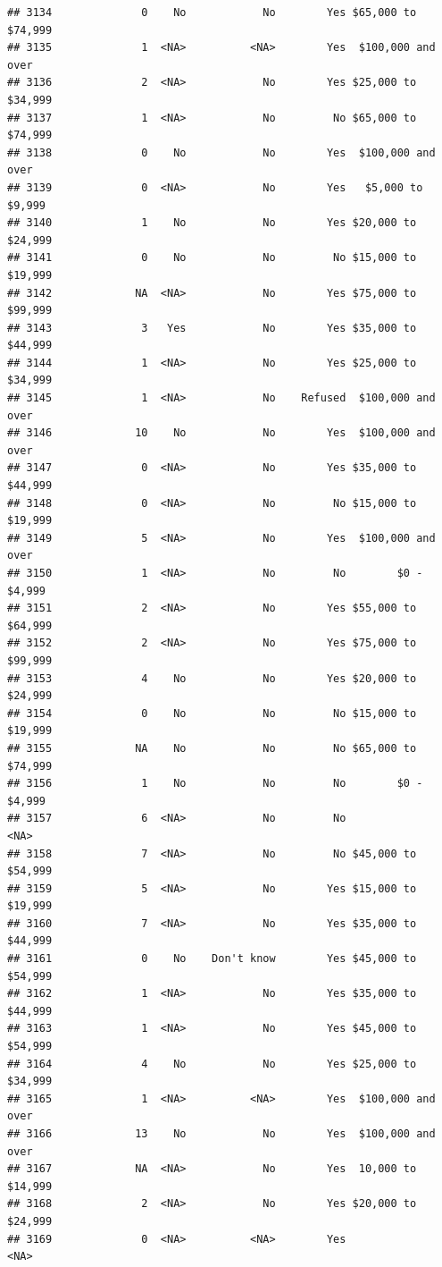 \documentclass[man]{apa6}
\begin{document}
\begin{verbatim}
## 3134              0    No            No        Yes $65,000 to $74,999
## 3135              1  <NA>          <NA>        Yes  $100,000 and over
## 3136              2  <NA>            No        Yes $25,000 to $34,999
## 3137              1  <NA>            No         No $65,000 to $74,999
## 3138              0    No            No        Yes  $100,000 and over
## 3139              0  <NA>            No        Yes   $5,000 to $9,999
## 3140              1    No            No        Yes $20,000 to $24,999
## 3141              0    No            No         No $15,000 to $19,999
## 3142             NA  <NA>            No        Yes $75,000 to $99,999
## 3143              3   Yes            No        Yes $35,000 to $44,999
## 3144              1  <NA>            No        Yes $25,000 to $34,999
## 3145              1  <NA>            No    Refused  $100,000 and over
## 3146             10    No            No        Yes  $100,000 and over
## 3147              0  <NA>            No        Yes $35,000 to $44,999
## 3148              0  <NA>            No         No $15,000 to $19,999
## 3149              5  <NA>            No        Yes  $100,000 and over
## 3150              1  <NA>            No         No        $0 - $4,999
## 3151              2  <NA>            No        Yes $55,000 to $64,999
## 3152              2  <NA>            No        Yes $75,000 to $99,999
## 3153              4    No            No        Yes $20,000 to $24,999
## 3154              0    No            No         No $15,000 to $19,999
## 3155             NA    No            No         No $65,000 to $74,999
## 3156              1    No            No         No        $0 - $4,999
## 3157              6  <NA>            No         No               <NA>
## 3158              7  <NA>            No         No $45,000 to $54,999
## 3159              5  <NA>            No        Yes $15,000 to $19,999
## 3160              7  <NA>            No        Yes $35,000 to $44,999
## 3161              0    No    Don't know        Yes $45,000 to $54,999
## 3162              1  <NA>            No        Yes $35,000 to $44,999
## 3163              1  <NA>            No        Yes $45,000 to $54,999
## 3164              4    No            No        Yes $25,000 to $34,999
## 3165              1  <NA>          <NA>        Yes  $100,000 and over
## 3166             13    No            No        Yes  $100,000 and over
## 3167             NA  <NA>            No        Yes  10,000 to $14,999
## 3168              2  <NA>            No        Yes $20,000 to $24,999
## 3169              0  <NA>          <NA>        Yes               <NA>

\end{verbatim}
\end{document}
